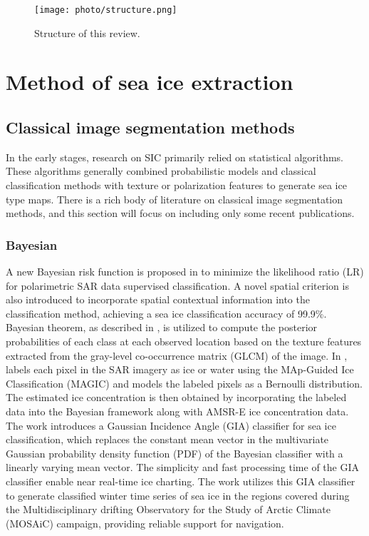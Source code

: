 \begin{figure*}[!tbh]
	\centering
	\texttt{[image: photo/structure.png]}
	\caption{Structure of this review.}
	\label{fig:oview}
\end{figure*}


\section {Method of sea ice extraction}
\label{section:B}

\subsection {Classical image segmentation methods}
In the early stages, research on SIC primarily relied on statistical algorithms. These algorithms generally combined probabilistic models and classical classification methods with texture or polarization features to generate sea ice type maps. There is a rich body of literature on classical image segmentation methods, and this section will focus on including only some recent publications.

\subsubsection {Bayesian}
A new Bayesian risk function is proposed in \cite{1dabboor2013new} to minimize the likelihood ratio (LR) for polarimetric SAR data supervised classification. A novel spatial criterion is also introduced to incorporate spatial contextual information into the classification method, achieving a sea ice classification accuracy of 99.9\%. Bayesian theorem, as described in \cite{2ashouri2014heuristic}, is utilized to compute the posterior probabilities of each class at each observed location based on the texture features extracted from the gray-level co-occurrence matrix (GLCM) of the image. In \cite{3wang2016improved}, labels each pixel in the SAR imagery as ice or water using the MAp-Guided Ice Classification (MAGIC) \cite{18clausi2010magic} and models the labeled pixels as a Bernoulli distribution. The estimated ice concentration is then obtained by incorporating the labeled data into the Bayesian framework along with AMSR-E ice concentration data. The work \cite{4lohse2020mapping} introduces a Gaussian Incidence Angle (GIA) classifier for sea ice classification, which replaces the constant mean vector in the multivariate Gaussian probability density function (PDF) of the Bayesian classifier with a linearly varying mean vector. The simplicity and fast processing time of the GIA classifier enable near real-time ice charting. The work \cite{16guo2023sea} utilizes this GIA classifier to generate classified winter time series of sea ice in the regions covered during the Multidisciplinary drifting Observatory for the Study of Arctic Climate (MOSAiC) campaign, providing reliable support for navigation.

